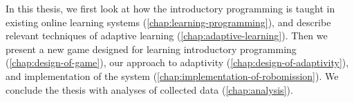 

In this thesis, we first look at how the introductory programming is taught
in existing online learning systems
(\cref{chap:learning-programming}),
and describe relevant techniques of adaptive learning
(\cref{chap:adaptive-learning}).
Then we present a new game designed for learning introductory programming
(\cref{chap:design-of-game}),
our approach to adaptivity (\cref{chap:design-of-adaptivity}),
and implementation of the system (\cref{chap:implementation-of-robomission}).
We conclude the thesis with analyses of collected data
(\cref{chap:analysis}).
